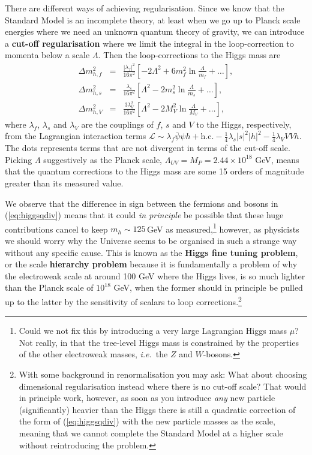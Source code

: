 \documentclass[notes.tex]{subfiles}
\begin{document}
There are different ways of achieving regularisation. Since we know that the Standard Model is an incomplete theory, at least when we go up to Planck scale energies where we need an unknown quantum theory of gravity, we can introduce a {\bf cut-off regularisation} where we limit the integral in the loop-correction to momenta below a scale $\Lambda$. Then the loop-corrections to the Higgs mass are
\begin{eqnarray}
\Delta m_{h,f}^2 &=& \frac{|\lambda_f|^2}{16\pi^2}\left[-2\Lambda^2 +6m_f^2\ln\frac{\Lambda}{m_f}+\ldots \right], \label{eq:higgsqdiv} \\
\Delta m_{h,s}^2 &=&  \frac{\lambda_s}{16\pi^2}\left[\Lambda^2 -2m_s^2\ln\frac{\Lambda}{m_s}+\ldots\right],  \\
\Delta m_{h,V}^2 &=& \frac{3\lambda_V^2}{16\pi^2}\left[\Lambda^2 - 2M_V^2\ln\frac{\Lambda}{M_V}+\ldots \right],
\end{eqnarray}
where $\lambda_f$, $\lambda_s$ and $\lambda_V$ are the couplings of $f$, $s$ and $V$ to the Higgs, respectively, from the Lagrangian interaction terms $\mathcal L \sim \lambda_f \bar\psi\psi h+\text{h.c.}-\frac{1}{4}\lambda_s |s|^2 |h|^2-\frac{1}{4}\lambda_V VV h$. The dots represents terms that are not divergent in terms of the cut-off scale.
Picking $\Lambda$  suggestively as the Planck scale, $\Lambda_{UV} =M_P = 2.44\times 10^{18}$ GeV, means that the quantum corrections to the Higgs mass are some 15 orders of magnitude greater than its measured value. 

We observe that the difference in sign between the fermions and bosons in (\ref{eq:higgsqdiv}) means that it could {\it in principle} be possible that these huge contributions cancel to keep $m_h \sim 125$\,GeV as measured,\footnote{Could we not fix this by introducing a very large Lagrangian Higgs mass $\mu$? Not really, in that the tree-level Higgs mass is constrained by the properties of the other electroweak masses, {\it i.e.}\ the $Z$ and $W$-bosons.} however, as physicists we should worry why the Universe seems to be organised in such a strange way without any specific cause. This is known as the {\bf Higgs fine tuning problem}, or the scale {\bf hierarchy problem} because it is fundamentally a problem of why the electroweak scale at around 100 GeV where the Higgs lives, is so much lighter than the Planck scale of $10^{18}$ GeV, when the former should in principle be pulled up to the latter by the sensitivity of scalars to loop corrections.\footnote{With some background in renormalisation you may ask: What about choosing dimensional regularisation instead where there is no cut-off scale? That would in principle work, however, as soon as you introduce {\it any} new particle (significantly) heavier than the Higgs there is still a quadratic correction of the form of (\ref{eq:higgsqdiv}) with the new particle masses as the scale, meaning that we cannot complete the Standard Model at a higher scale without reintroducing the problem.}
\end{document}
